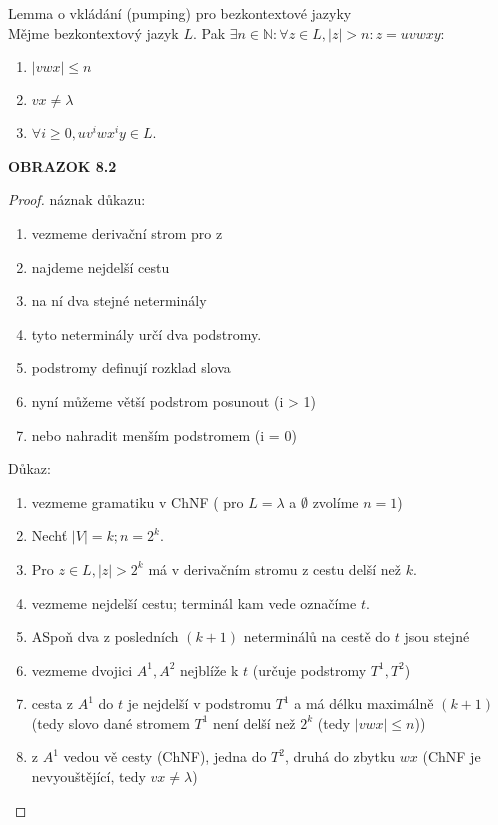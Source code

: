 \documentclass[../main.tex]{subfiles}
\begin{document}
\begin{theorem}
    Lemma o vkládání (pumping) pro bezkontextové jazyky\\

    Mějme bezkontextový jazyk $L$. Pak $ \exists n \in \mathbb{N} : \forall z\in L, |z| > n : z = uvwxy :$
    \begin{enumerate}
        \item $|vwx| \leq n$
        \item $vx \neq \lambda$
        \item $\forall i \geq 0, uv^iwx^iy \in L$.
    \end{enumerate}
    \textbf{OBRAZOK 8.2}
    \begin{proof}
        náznak důkazu:
        \begin{enumerate}
            \item vezmeme derivační strom pro z
            \item najdeme nejdelší cestu
            \item na ní dva stejné neterminály
            \item tyto neterminály určí dva podstromy.
            \item podstromy definují rozklad slova
            \item nyní můžeme větší podstrom posunout (i > 1)
            \item nebo nahradit menším podstromem (i = 0)
        \end{enumerate}
        Důkaz:
        \begin{enumerate}
            \item vezmeme gramatiku v ChNF ( pro $L = {\lambda}$ a $\emptyset$ zvolíme   $n = 1$)
            \item Nechť $|V| = k; n=2^k$.
            \item Pro $z\in L, |z| > 2^k$ má v derivačním stromu z cestu delší než $k$.
            \item vezmeme nejdelší cestu; terminál kam vede označíme $t$.
            \item ASpoň dva z posledních $(k+1)$ neterminálů na cestě do $t$ jsou stejné
            \item vezmeme dvojici $A^1,A^2$ nejblíže k $t$ (určuje podstromy $T^1,T^2$)
            \item cesta z $A^1$ do $t$ je nejdelší v podstromu $T^1$ a má délku maximálně $(k+1)$ (tedy slovo dané stromem $T^1$ není delší než $2^k$ (tedy $|vwx| \leq n$))
            \item z $A^1$ vedou vě cesty (ChNF), jedna do $T^2$, druhá do zbytku $wx$ (ChNF je nevyouštějící, tedy $vx \neq \lambda$)

\end{enumerate}
\end{proof}
\end{theorem}
\end{document}
